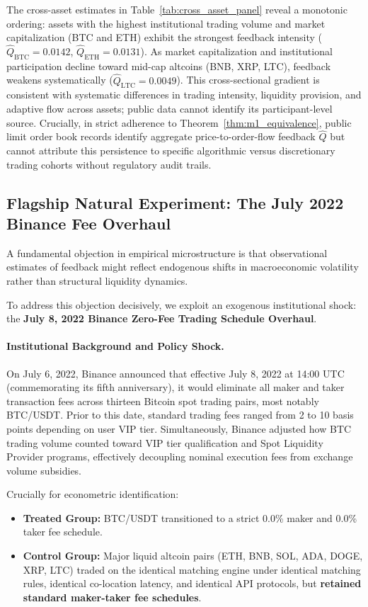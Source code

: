 \documentclass[12pt]{article}
\theoremstyle{definition}
\theoremstyle{remark}
\begin{document}
The cross-asset estimates in Table~\ref{tab:cross_asset_panel} reveal a monotonic ordering: assets with the highest institutional trading volume and market capitalization (BTC and ETH) exhibit the strongest feedback intensity ($\hat{Q}_{\text{BTC}} = 0.0142$, $\hat{Q}_{\text{ETH}} = 0.0131$). As market capitalization and institutional participation decline toward mid-cap altcoins (BNB, XRP, LTC), feedback weakens systematically ($\hat{Q}_{\text{LTC}} = 0.0049$). This cross-sectional gradient is consistent with systematic differences in trading intensity, liquidity provision, and adaptive flow across assets; public data cannot identify its participant-level source. Crucially, in strict adherence to Theorem~\ref{thm:m1_equivalence}, public limit order book records identify aggregate price-to-order-flow feedback $\hat{Q}$ but cannot attribute this persistence to specific algorithmic versus discretionary trading cohorts without regulatory audit trails.

\subsection{Flagship Natural Experiment: The July 2022 Binance Fee Overhaul}
A fundamental objection in empirical microstructure is that observational estimates of feedback might reflect endogenous shifts in macroeconomic volatility rather than structural liquidity dynamics.

To address this objection decisively, we exploit an exogenous institutional shock: the \textbf{July 8, 2022 Binance Zero-Fee Trading Schedule Overhaul}.

\paragraph{Institutional Background and Policy Shock.}
On July 6, 2022, Binance announced that effective July 8, 2022 at 14:00 UTC (commemorating its fifth anniversary), it would eliminate all maker and taker transaction fees across thirteen Bitcoin spot trading pairs, most notably BTC/USDT. Prior to this date, standard trading fees ranged from 2 to 10 basis points depending on user VIP tier. Simultaneously, Binance adjusted how BTC trading volume counted toward VIP tier qualification and Spot Liquidity Provider programs, effectively decoupling nominal execution fees from exchange volume subsidies.

Crucially for econometric identification:
\begin{itemize}
    \item \textbf{Treated Group:} BTC/USDT transitioned to a strict 0.0\% maker and 0.0\% taker fee schedule.
    \item \textbf{Control Group:} Major liquid altcoin pairs (ETH, BNB, SOL, ADA, DOGE, XRP, LTC) traded on the identical matching engine under identical matching rules, identical co-location latency, and identical API protocols, but \textbf{retained standard maker-taker fee schedules}.
\end{itemize}
\end{document}
